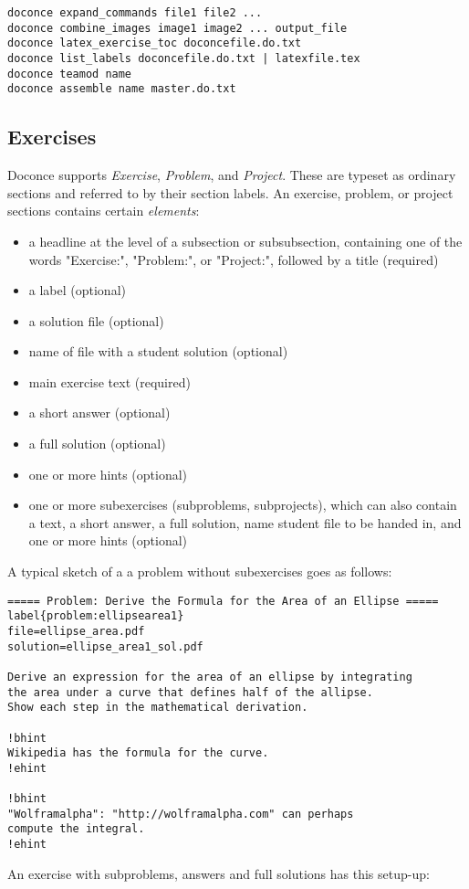 \documentclass[twoside]{article}
\begin{document}
\begin{Verbatim}
doconce expand_commands file1 file2 ...
doconce combine_images image1 image2 ... output_file
doconce latex_exercise_toc doconcefile.do.txt
doconce list_labels doconcefile.do.txt | latexfile.tex
doconce teamod name
doconce assemble name master.do.txt
\end{Verbatim}

\subsection{Exercises}

Doconce supports \emph{Exercise}, \emph{Problem}, and \emph{Project}. These are typeset
as ordinary sections and referred to by their section labels.
An exercise, problem, or project sections contains certain \emph{elements}:

\begin{itemize}
  \item a headline at the level of a subsection or subsubsection,
    containing one of the words "Exercise:", "Problem:", or
    "Project:", followed by a title (required)

  \item a label (optional)

  \item a solution file (optional)

  \item name of file with a student solution (optional)

  \item main exercise text (required)

  \item a short answer (optional)

  \item a full solution (optional)

  \item one or more hints (optional)

  \item one or more subexercises (subproblems, subprojects), which can also
    contain a text, a short answer, a full solution, name student file
    to be handed in, and one or more hints (optional)
\end{itemize}

\noindent
A typical sketch of a a problem without subexercises goes as follows:
\begin{Verbatim}
===== Problem: Derive the Formula for the Area of an Ellipse =====
label{problem:ellipsearea1}
file=ellipse_area.pdf
solution=ellipse_area1_sol.pdf

Derive an expression for the area of an ellipse by integrating
the area under a curve that defines half of the allipse.
Show each step in the mathematical derivation.

!bhint
Wikipedia has the formula for the curve.
!ehint

!bhint
"Wolframalpha": "http://wolframalpha.com" can perhaps
compute the integral.
!ehint
\end{Verbatim}
An exercise with subproblems, answers and full solutions has this
setup-up:
\end{document}
